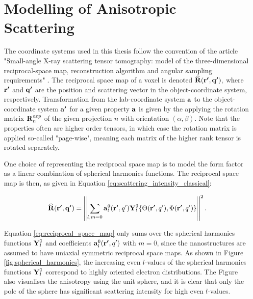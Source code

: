 \section{Modelling of Anisotropic Scattering} \label{sec:modelling_scattering}
The coordinate systems used in this thesis follow the convention of the article "Small-angle X-ray scattering tensor tomography:
model of the three-dimensional reciprocal-space
map, reconstruction algorithm and angular
sampling requirements" \cite{liebi2018small}.
The reciprocal space map of a voxel is denoted $\bm{\mathrm{\widehat{R}}}(\bm{\mathrm{r'}}, \bm{\mathrm{q'}})$,
where $\bm{\mathrm{r'}}$ and $\bm{\mathrm{q'}}$ are the position and scattering vector in the object-coordinate system, respectively.
Transformation from the lab-coordinate system $\bm{\mathrm{a}}$ to the object-coordinate system $\bm{\mathrm{a'}}$ for a given property $\bm{\mathrm{a}}$
is given by the applying the rotation matrix $\bm{\mathrm{R}}_{n}^{exp}$ of the given projection $n$ with orientation $\left(\alpha,\beta\right)$.
Note that the properties often are higher order tensors, in which case the rotation matrix is applied so-called "page-wise",
meaning each matrix of the higher rank tensor is rotated separately.


One choice of representing the reciprocal space map is to model the form factor as a linear combination of spherical harmonics functions.
The reciprocal space map is then,
as given in Equation \eqref{eq:scattering_intensity_classical}:

\begin{equation}\label{eq:reciprocal_space_map}
    \bm{\mathrm{\widehat{R}}}(\bm{\mathrm{r'}}, \bm{\mathrm{q'}}) = \left\| \sum_{l, m=0} \bm{\mathrm{a}}_{l}^{0}(\bm{\mathrm{r'}}, q') \bm{\mathrm{Y}}_{l}^{0} \{ \Theta(\bm{\mathrm{r'}}, q'), \Phi(\bm{\mathrm{r'}}, q') \} \right\|^{2}.
\end{equation}

Equation \eqref{eq:reciprocal_space_map} only sums over the spherical harmonics functions $\bm{\mathrm{Y}}_{l}^{0}$ and coefficients $\bm{\mathrm{a}}_{l}^{0}(\bm{\mathrm{r'}}, q')$ with $m=0$,
since the nanostructures are assumed to have uniaxial symmetric reciprocal space maps.
As shown in Figure \ref{fig:spherical_harmonics}, the increasing even $l$-values of the spherical harmonics functions $\bm{\mathrm{Y}}_{l}^{0}$ correspond to highly oriented electron distributions.
The Figure also visualises the anisotropy using the unit sphere, and it is clear that only the pole of the sphere has significant scattering intensity for high even $l$-values.

